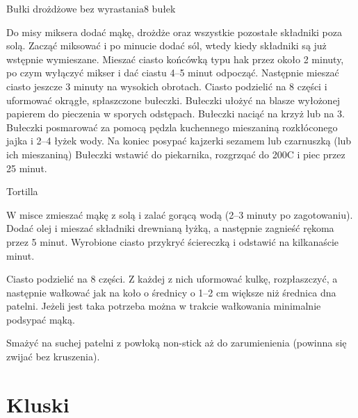 \documentclass[a4paper,12pt]{article}
\begin{document}
\begin{recipe}{Bułki drożdżowe bez wyrastania}{8 bułek}{}


Do misy miksera dodać mąkę, drożdże oraz wszystkie pozostałe składniki poza solą.
Zacząć miksować i po minucie dodać sól, wtedy kiedy składniki są już wstępnie wymieszane.
Mieszać ciasto końcówką typu hak przez około 2 minuty, po czym wyłączyć mikser i dać ciastu 4--5 minut odpocząć.
Następnie mieszać ciasto jeszcze 3 minuty na wysokich obrotach.
\freeform%
Ciasto podzielić na 8 części i uformować okrągłe, spłaszczone bułeczki.
Bułeczki ułożyć na blasze wyłożonej papierem do pieczenia w sporych odstępach.
Bułeczki naciąć na krzyż lub na 3.
Bułeczki posmarować za pomocą pędzla kuchennego mieszaniną rozkłóconego jajka i 2--4 łyżek wody.
Na koniec posypać kajzerki sezamem lub czarnuszką (lub ich mieszaniną)
Bułeczki wstawić do piekarnika, rozgrzqać do 200\0C i piec przez 25 minut.


\end{recipe}

\begin{recipe}{Tortilla}{}{}

W misce zmieszać mąkę z solą i zalać gorącą wodą (2--3 minuty po zagotowaniu).
Dodać olej i mieszać składniki drewnianą łyżką, a następnie zagnieść rękoma przez 5 minut.
Wyrobione ciasto przykryć ściereczką i odstawić na kilkanaście minut.

\freeform%
Ciasto podzielić na 8 części. Z każdej z nich uformować kulkę, rozpłaszczyć, a następnie wałkować jak na koło o średnicy o 1--2 cm większe niż średnica dna patelni. 
Jeżeli jest taka potrzeba można w trakcie wałkowania minimalnie podsypać mąką. 
 
Smażyć na suchej patelni z powłoką non-stick aż do zarumienienia (powinna się zwijać bez kruszenia).

\end{recipe}


\newpage

\section{Kluski}
\end{document}
